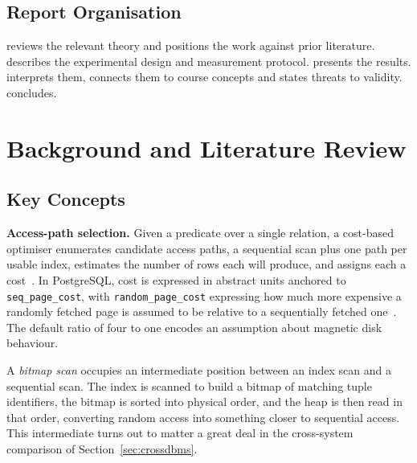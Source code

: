 \documentclass[12pt, a4paper]{article}
\newcommand{\rpc}{\texttt{random\_page\_cost}}
\begin{document}
\subsection{Report Organisation}

 reviews the relevant theory and positions the work
against prior literature.  describes the
experimental design and measurement protocol. 
presents the results.  interprets them, connects
them to course concepts and states threats to validity.
 concludes.

\section{Background and Literature Review}
\label{sec:background}

\subsection{Key Concepts}

\textbf{Access-path selection.} Given a predicate over a single
relation, a cost-based optimiser enumerates candidate access paths, a
sequential scan plus one path per usable index, estimates the number of
rows each will produce, and assigns each a
cost~\cite{selinger1979access, chaudhuri1998overview, graefe1993query}.
In PostgreSQL, cost is expressed in abstract units anchored to
\texttt{seq\_page\_cost}, with \rpc{} expressing how much more expensive
a randomly fetched page is assumed to be relative to a sequentially
fetched one~\cite{pgdocs17indexcost}. The default ratio of four to one
encodes an assumption about magnetic disk behaviour.

A \emph{bitmap scan} occupies an intermediate position between an index
scan and a sequential scan. The index is scanned to build a bitmap of
matching tuple identifiers, the bitmap is sorted into physical order,
and the heap is then read in that order, converting random access into
something closer to sequential access. This intermediate turns out to
matter a great deal in the cross-system comparison of
Section~\ref{sec:crossdbms}.
\end{document}
